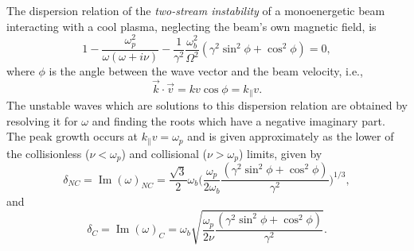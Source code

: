 \documentclass [12pt,a4paper,     ]{report} %
\newcommand{\IMA}{\operatorname{Im}}  %
\begin{document}
	The dispersion relation of the \emph{two-stream instability} of a monoenergetic beam interacting with a cool plasma, neglecting the beam's own magnetic field, is \cite{BRIGG1971-,WATSO1960-,BLUDM1960-,LEE--1977B}
%
\begin{equation}\label{mic:1} %
   1 - \frac{\omega_p^2}{\omega(\omega+i\nu)}
     - \frac{1}{\gamma^2}\frac{\omega_b^2}{\Omega^2}
       (\gamma^2 \sin^2\phi + \cos^2\phi)
     = 0,
\end{equation}
%
where $\phi$ is the angle between the wave vector and the beam velocity, i.e.,
%
\begin{equation}\label{mic:2} %
    \vec{k} \cdot \vec{v} = k v \cos\phi = k_{\|} v.
\end{equation}
%
The unstable waves which are solutions to this dispersion relation are obtained by resolving it for $\omega$ and finding the roots which have a negative imaginary part.  The peak growth occurs at $k_{\|}v =  \omega_p$ and is given approximately as the lower of the collisionless ($\nu < \omega_p$) and collisional  ($\nu > \omega_p$) limits, given by
%
\begin{equation}\label{mic:3} %
   \delta_{NC} = \IMA(\omega)_{NC} = \frac{\sqrt{3}}{2}\omega_b
   \Biggl( \frac{\omega_p}{2\omega_b}
           \frac{(\gamma^2 \sin^2\phi + \cos^2\phi)}{\gamma^2} \Biggr)^{1/3},
\end{equation}
%
and
%
\begin{equation}\label{mic:4} %
   \delta_C = \IMA(\omega)_C = \omega_b
            \sqrt{ \frac{\omega_p}{2\nu}
                \frac{(\gamma^2 \sin^2\phi + \cos^2\phi)}{\gamma^2} }.
\end{equation}
%
\end{document}
